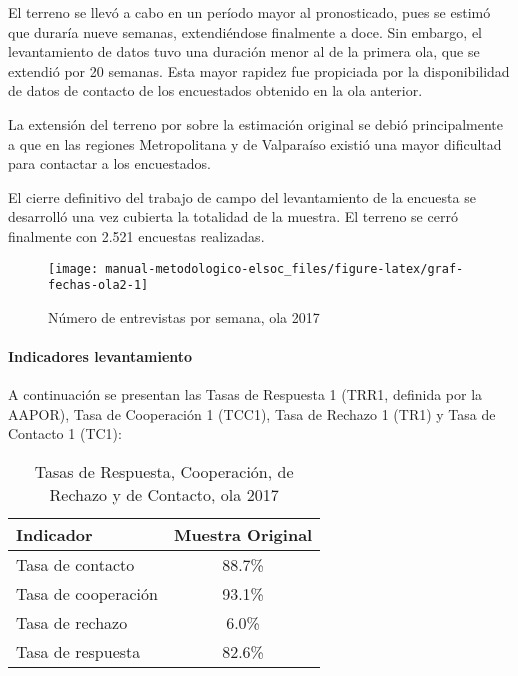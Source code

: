 \documentclass[
  12pt,
]{article}
\begin{document}
El terreno se llevó a cabo en un período mayor al pronosticado, pues se estimó que duraría nueve semanas, extendiéndose finalmente a doce. Sin embargo, el levantamiento de datos tuvo una duración menor al de la primera ola, que se extendió por 20 semanas. Esta mayor rapidez fue propiciada por la disponibilidad de datos de contacto de los encuestados obtenido en la ola anterior.

La extensión del terreno por sobre la estimación original se debió principalmente a que en las regiones Metropolitana y de Valparaíso existió una mayor dificultad para contactar a los encuestados.

El cierre definitivo del trabajo de campo del levantamiento de la encuesta se desarrolló una vez cubierta la totalidad de la muestra. El terreno se cerró finalmente con 2.521 encuestas realizadas.

\begin{figure}

{\centering \texttt{[image: manual-metodologico-elsoc\_files/figure-latex/graf-fechas-ola2-1]} 

}

\caption{Número de entrevistas por semana, ola 2017}\label{fig:graf-fechas-ola2}
\end{figure}

\hypertarget{indicadores-levantamiento-1}{%
\paragraph*{Indicadores levantamiento}\label{indicadores-levantamiento-1}}

A continuación se presentan las Tasas de Respuesta 1 (TRR1, definida por la AAPOR), Tasa de Cooperación 1 (TCC1), Tasa de Rechazo 1 (TR1) y Tasa de Contacto 1 (TC1):

\begin{table}[H]

\caption{\label{tab:tabla-tasas-ola2}Tasas de Respuesta, Cooperación, de Rechazo y de Contacto, ola 2017}
\centering
\begin{tabular}[t]{lc}
\toprule
Indicador & Muestra Original\\
\midrule
Tasa de contacto & 88.7\%\\
Tasa de cooperación & 93.1\%\\
Tasa de rechazo & 6.0\%\\
Tasa de respuesta & 82.6\%\\
\bottomrule
\end{tabular}
\end{table}
\end{document}
